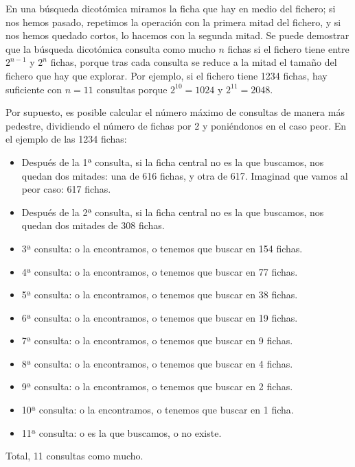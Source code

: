 En una búsqueda dicotómica miramos la ficha que hay en medio del fichero; si nos hemos pasado, repetimos la operación con la primera mitad del fichero, y si nos hemos quedado cortos, lo hacemos con la segunda mitad. Se puede demostrar que la búsqueda dicotómica consulta como mucho $n$ fichas si el fichero tiene entre $2^{n-1}$ y $2^n$ fichas, porque tras cada consulta se reduce a la mitad el tamaño del fichero que hay que explorar. Por ejemplo, si el fichero tiene 1234 fichas, hay suficiente con $n=11$ consultas porque $2^{10}=1024$ y $2^{11}=2048$. 

Por supuesto, es posible calcular el número máximo de consultas de manera más pedestre, dividiendo el número de fichas por 2 y poniéndonos en el caso peor. En el ejemplo de las 1234 fichas: \begin{itemize} \item Después de la 1ª consulta, si la ficha central no es la que buscamos, nos quedan dos mitades: una de 616 fichas, y otra de 617. Imaginad que vamos al peor caso: 617 fichas. \item Después de la 2ª consulta, si la ficha central no es la que buscamos, nos quedan dos mitades de 308 fichas. \item 3ª consulta: o la encontramos, o tenemos que buscar en 154 fichas. \item 4ª consulta: o la encontramos, o tenemos que buscar en 77 fichas. \item 5ª consulta: o la encontramos, o tenemos que buscar en 38 fichas. \item 6ª consulta: o la encontramos, o tenemos que buscar en 19 fichas. \item 7ª consulta: o la encontramos, o tenemos que buscar en 9 fichas. \item 8ª consulta: o la encontramos, o tenemos que buscar en 4 fichas. \item 9ª consulta: o la encontramos, o tenemos que buscar en 2 fichas. \item 10ª consulta: o la encontramos, o tenemos que buscar en 1 ficha. \item 11ª consulta: o es la que buscamos, o no existe. \end{itemize} Total, 11 consultas como mucho. 

